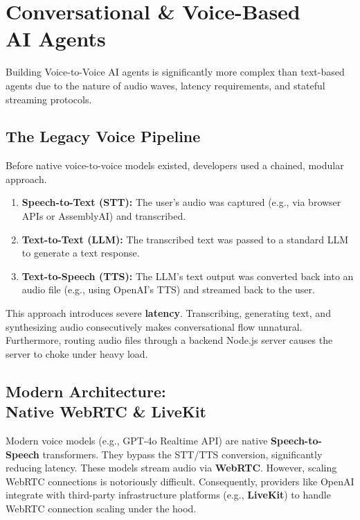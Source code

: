 \documentclass[12pt,a4paper,oneside]{book}
\begin{document}
\chapter[Conversational \& Voice AI]{Conversational \& Voice-Based\\AI Agents}

Building Voice-to-Voice AI agents is significantly more complex than text-based agents due to the nature of audio waves, latency requirements, and stateful streaming protocols.

\section{The Legacy Voice Pipeline}
Before native voice-to-voice models existed, developers used a chained, modular approach.
\begin{enumerate}
	\item \textbf{Speech-to-Text (STT):} The user's audio was captured (e.g., via browser APIs or AssemblyAI) and transcribed.
	\item \textbf{Text-to-Text (LLM):} The transcribed text was passed to a standard LLM to generate a text response.
	\item \textbf{Text-to-Speech (TTS):} The LLM's text output was converted back into an audio file (e.g., using OpenAI's TTS) and streamed back to the user.
\end{enumerate}

\begin{warningbox}
	This approach introduces severe \textbf{latency}. Transcribing, generating text, and synthesizing audio consecutively makes conversational flow unnatural. Furthermore, routing audio files through a backend Node.js server causes the server to choke under heavy load.
\end{warningbox}

\section[Native WebRTC \& LiveKit]{Modern Architecture:\\Native WebRTC \& LiveKit}
Modern voice models (e.g., GPT-4o Realtime API) are native \textbf{Speech-to-Speech} transformers. They bypass the STT/TTS conversion, significantly reducing latency.
These models stream audio via \textbf{WebRTC}. However, scaling WebRTC connections is notoriously difficult. Consequently, providers like OpenAI integrate with third-party infrastructure platforms (e.g., \textbf{LiveKit}) to handle WebRTC connection scaling under the hood.
\end{document}
